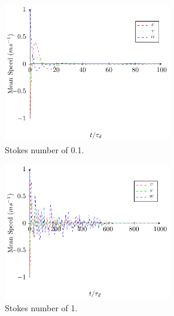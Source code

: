 \documentclass[../Interim_Report_Master]{subfiles}
\begin{document}
\begin{figure}[H]
	\centering
	\begin{subfigure}[t]{0.6\textwidth}
		\centering
		\includegraphics[width=0.8\textwidth]{./Diagrams/Statistical_Verification_Test/stk_0_1/Statistical_Verification_Test_Velocity_stk_0_1_.pdf}
		\caption{Stokes number of 0.1.}
		\label{rel_vel_stk_0_1}
	\end{subfigure}
	\begin{subfigure}[t]{0.6\textwidth}
		\centering
		\includegraphics[width=0.8\textwidth]{./Diagrams/Statistical_Verification_Test/stk_1/Statistical_Verification_Test_Velocity_stk_1.pdf}
		\caption{Stokes number of 1.}
		\label{rel_vel_stk_1}
	\end{subfigure}
	\begin{subfigure}[t]{0.6\textwidth}
		\centering

\end{subfigure}
\end{figure}
\end{document}
